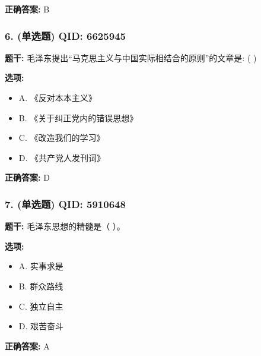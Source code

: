 \documentclass[12pt,UTF8]{ctexart}
\begin{document}
\textbf{正确答案:}
B

\vspace{0.3em}\hrulefill\vspace{0.7em}

\subsubsection*{6. (单选题) \small QID: 6625945}

\textbf{题干:}
毛泽东提出“马克思主义与中国实际相结合的原则”的文章是: ( )

\textbf{选项:}
\begin{itemize}[leftmargin=*]

  \item A. 《反对本本主义》

  \item B. 《关于纠正党内的错误思想》

  \item C. 《改造我们的学习》

  \item D. 《共产党人发刊词》

\end{itemize}

\textbf{正确答案:}
D

\vspace{0.3em}\hrulefill\vspace{0.7em}

\subsubsection*{7. (单选题) \small QID: 5910648}

\textbf{题干:}
毛泽东思想的精髓是（ ）。

\textbf{选项:}
\begin{itemize}[leftmargin=*]

  \item A. 实事求是

  \item B. 群众路线

  \item C. 独立自主

  \item D. 艰苦奋斗

\end{itemize}

\textbf{正确答案:}
A

\vspace{0.3em}\hrulefill\vspace{0.7em}
\end{document}
